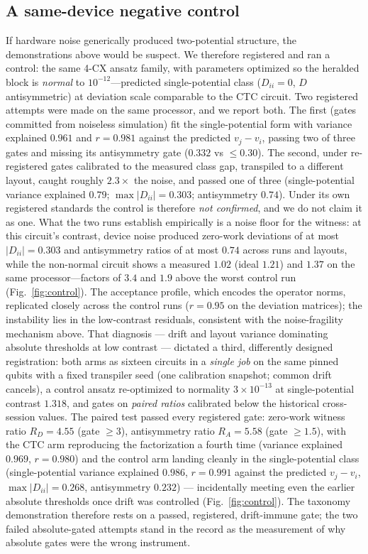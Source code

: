 \documentclass[aps,pra,twocolumn,superscriptaddress,nofootinbib]{revtex4-2}
\begin{document}
\subsection{A same-device negative control}
\label{sec:control}
If hardware noise generically produced two-potential structure, the demonstrations above would be suspect. We therefore registered and ran a control: the same 4-CX ansatz family, with parameters optimized so the heralded block is \emph{normal} to $10^{-12}$---predicted single-potential class ($D_{ii}=0$, $D$ antisymmetric) at deviation scale comparable to the CTC circuit. Two registered attempts were made on the same processor, and we report both. The first (gates committed from noiseless simulation) fit the single-potential form with variance explained $0.961$ and $r=0.981$ against the predicted $v_j-v_i$, passing two of three gates and missing its antisymmetry gate ($0.332$ vs $\leq0.30$). The second, under re-registered gates calibrated to the measured class gap, transpiled to a different layout, caught roughly $2.3\times$ the noise, and passed one of three (single-potential variance explained $0.79$; $\max|D_{ii}|=0.303$; antisymmetry $0.74$). Under its own registered standards the control is therefore \emph{not confirmed}, and we do not claim it as one. What the two runs establish empirically is a noise floor for the witness: at this circuit's contrast, device noise produced zero-work deviations of at most $|D_{ii}|=0.303$ and antisymmetry ratios of at most $0.74$ across runs and layouts, while the non-normal circuit shows a measured $1.02$ (ideal $1.21$) and $1.37$ on the same processor---factors of $3.4$ and $1.9$ above the worst control run (Fig.~\ref{fig:control}). The acceptance profile, which encodes the operator norms, replicated closely across the control runs ($r=0.95$ on the deviation matrices); the instability lies in the low-contrast residuals, consistent with the noise-fragility mechanism above. That diagnosis --- drift and layout variance dominating absolute thresholds at low contrast --- dictated a third, differently designed registration: both arms as sixteen circuits in a \emph{single job} on the same pinned qubits with a fixed transpiler seed (one calibration snapshot; common drift cancels), a control ansatz re-optimized to normality $3\times10^{-13}$ at single-potential contrast $1.318$, and gates on \emph{paired ratios} calibrated below the historical cross-session values. The paired test passed every registered gate: zero-work witness ratio $R_D=4.55$ (gate $\geq3$), antisymmetry ratio $R_A=5.58$ (gate $\geq1.5$), with the CTC arm reproducing the factorization a fourth time (variance explained $0.969$, $r=0.980$) and the control arm landing cleanly in the single-potential class (single-potential variance explained $0.986$, $r=0.991$ against the predicted $v_j-v_i$, $\max|D_{ii}|=0.268$, antisymmetry $0.232$) --- incidentally meeting even the earlier absolute thresholds once drift was controlled (Fig.~\ref{fig:control}). The taxonomy demonstration therefore rests on a passed, registered, drift-immune gate; the two failed absolute-gated attempts stand in the record as the measurement of why absolute gates were the wrong instrument.
\end{document}
